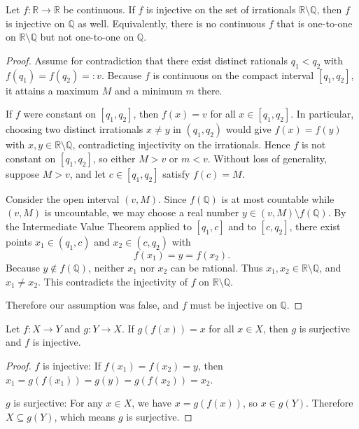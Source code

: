 \begin{exercise}
Let $f:\mathbb{R}\to\mathbb{R}$ be continuous. If $f$ is injective on the set
of irrationals $\mathbb{R}\setminus\mathbb{Q}$, then $f$ is injective on $\mathbb{Q}$ as well.
Equivalently, there is no continuous $f$ that is one-to-one on $\mathbb{R}\setminus\mathbb{Q}$
but not one-to-one on $\mathbb{Q}$.
\end{exercise}

\begin{proof}
Assume for contradiction that there exist distinct rationals $q_1<q_2$ with
$f(q_1)=f(q_2)=:v$. Because $f$ is continuous on the compact interval $[q_1,q_2]$,
it attains a maximum $M$ and a minimum $m$ there.

If $f$ were constant on $[q_1,q_2]$, then $f(x)=v$ for all $x\in[q_1,q_2]$.
In particular, choosing two distinct irrationals $x\neq y$ in $(q_1,q_2)$ would give
$f(x)=f(y)$ with $x,y\in\mathbb{R}\setminus\mathbb{Q}$, contradicting injectivity on
the irrationals. Hence $f$ is not constant on $[q_1,q_2]$, so either $M>v$ or $m<v$.
Without loss of generality, suppose $M>v$, and let $c\in[q_1,q_2]$ satisfy $f(c)=M$.

Consider the open interval $(v,M)$. Since $f(\mathbb{Q})$ is at most countable while $(v,M)$
is uncountable, we may choose a real number $y\in(v,M)\setminus f(\mathbb{Q})$.
By the Intermediate Value Theorem applied to $[q_1,c]$ and to $[c,q_2]$, there exist points
$x_1\in(q_1,c)$ and $x_2\in(c,q_2)$ with
\[
f(x_1)=y=f(x_2).
\]
Because $y\notin f(\mathbb{Q})$, neither $x_1$ nor $x_2$ can be rational.
Thus $x_1,x_2\in\mathbb{R}\setminus\mathbb{Q}$, and $x_1\neq x_2$.
This contradicts the injectivity of $f$ on $\mathbb{R}\setminus\mathbb{Q}$.

Therefore our assumption was false, and $f$ must be injective on $\mathbb{Q}$.
\end{proof}

\begin{exercise}
    Let $f: X \to Y$ and $g: Y \to X$. If $g(f(x)) = x$ for all $x \in X$, then $g$ is surjective 
    and $f$ is injective.
\end{exercise}

\begin{proof}
   $f$ is injective: If $f(x_1) = f(x_2) = y$, then $x_1 = g(f(x_1)) = g(y) = g(f(x_2)) = x_2$.

   $g$ is surjective: For any $x \in X$, we have $x = g(f(x))$, so $x \in g(Y)$. Therefore $X \subseteq g(Y)$, which means $g$ is surjective.
\end{proof}


